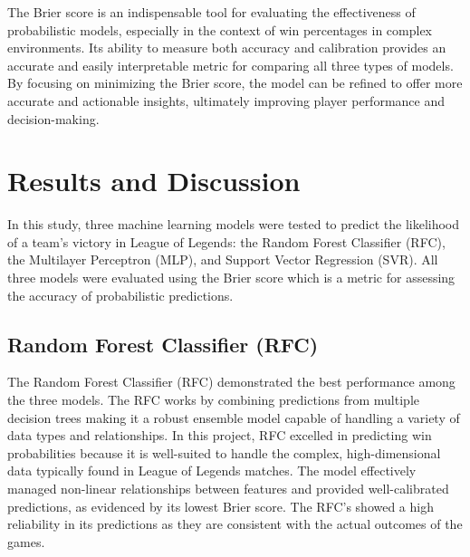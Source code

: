 \documentclass[10pt,twocolumn]{article}
\begin{document}
The Brier score is an indispensable tool for evaluating the effectiveness of probabilistic models, especially in the context of win percentages in complex environments. Its ability to measure both accuracy and calibration provides an accurate and easily interpretable metric for comparing all three types of models. By focusing on minimizing the Brier score, the model can be refined to offer more accurate and actionable insights, ultimately improving player performance and decision-making.


\section{Results and Discussion}

In this study, three machine learning models were tested to predict the likelihood of a team’s victory in League of Legends: the Random Forest Classifier (RFC), the Multilayer Perceptron (MLP), and Support Vector Regression (SVR). All three models were evaluated using the Brier score which is a metric for assessing the accuracy of probabilistic predictions.

\subsection{Random Forest Classifier (RFC)}
The Random Forest Classifier (RFC) demonstrated the best performance among the three models. The RFC works by combining predictions from multiple decision trees making it a robust ensemble model capable of handling a variety of data types and relationships. In this project, RFC excelled in predicting win probabilities because it is well-suited to handle the complex, high-dimensional data typically found in League of Legends matches. The model effectively managed non-linear relationships between features and provided well-calibrated predictions, as evidenced by its lowest Brier score. The RFC's showed a high reliability in its predictions as they are consistent with the actual outcomes of the games.
\end{document}
